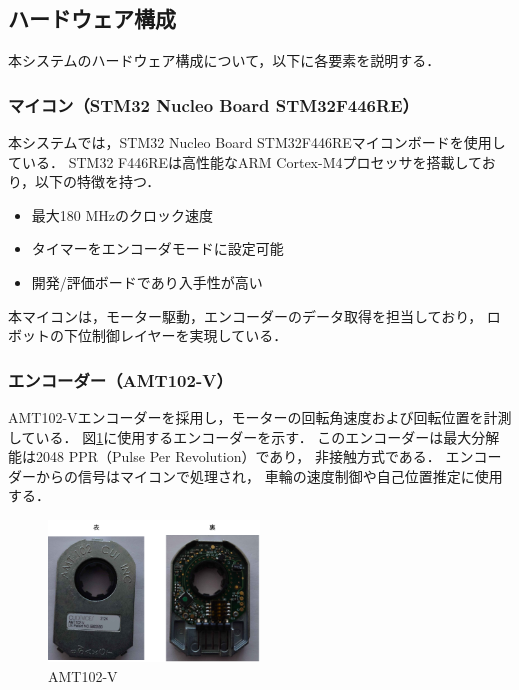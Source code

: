 
\subsection{ハードウェア構成}
本システムのハードウェア構成について，以下に各要素を説明する．

\subsubsection{マイコン（STM32 Nucleo Board STM32F446RE）}
本システムでは，STM32 Nucleo Board STM32F446REマイコンボードを使用している．
STM32 F446REは高性能なARM Cortex-M4プロセッサを搭載しており，以下の特徴を持つ．
\begin{itemize}
    \item 最大180 MHzのクロック速度
    \item タイマーをエンコーダモードに設定可能
    \item 開発/評価ボードであり入手性が高い
\end{itemize}
本マイコンは，モーター駆動，エンコーダーのデータ取得を担当しており，
ロボットの下位制御レイヤーを実現している．


\subsubsection{エンコーダー（AMT102-V）}
AMT102-Vエンコーダーを採用し，モーターの回転角速度および回転位置を計測している．
図\ref{fig:AMT102}に使用するエンコーダーを示す．
このエンコーダーは最大分解能は2048 PPR（Pulse Per Revolution）であり，
非接触方式である．
エンコーダーからの信号はマイコンで処理され，
車輪の速度制御や自己位置推定に使用する．

\begin{figure}[H]
    \centering
    \includegraphics[width=0.5\textwidth]{figure/AMT102.pdf}
    \caption{AMT102-V}
    \label{fig:AMT102}
\end{figure}

